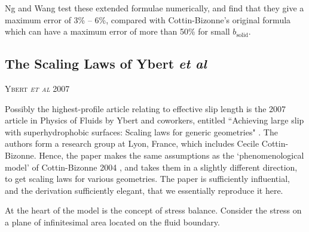 \documentclass[a4paper]{report}
\newcommand{\paper}[1]
         {\colorbox[gray]{0.8}{ \textsc{#1}}
         
         }
\begin{document}
Ng and Wang test these extended formulae numerically, and find that they give a maximum error of 3\% -- 6\%, compared with Cottin-Bizonne's original formula which can have a maximum error of more than 50\% for small $b_{\mathrm{solid}}$.


\subsection*{The Scaling Laws of Ybert \emph{et al}}

\paper{Ybert \emph{et al} 2007}
Possibly the highest-profile article relating to effective slip length is the 2007 article in Physics of Fluids by Ybert and coworkers, entitled ``Achieving large slip with superhydrophobic surfaces: Scaling laws for generic geometries" \cite{Ybert2007}. The authors form a research group at Lyon, France, which includes Cecile Cottin-Bizonne.  Hence, the paper makes the same assumptions as the `phenomenological model' of Cottin-Bizonne 2004 \cite{Cottin-Bizonne2004}, and takes them in a slightly different direction, to get scaling laws for various geometries.
The paper is sufficiently influential, and the derivation sufficiently elegant, that we essentially reproduce it here.


At the heart of the model is the concept of stress balance.  Consider the stress on a plane of infinitesimal area located on the fluid boundary.

\begin{center}
\end{center}
\end{document}
